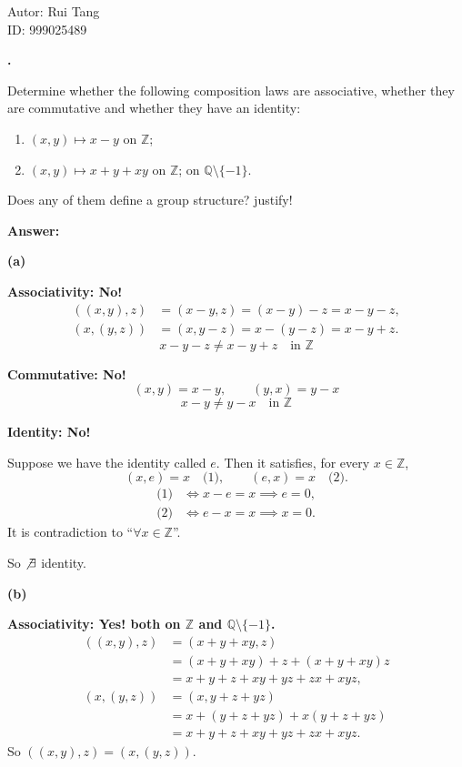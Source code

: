 \documentclass[11pt]{article}
\newcounter{ej}
\renewcommand{\theej}{\textbf{\arabic{ej}.}}
\newenvironment{ej}{
    \stepcounter{ej}
    \begin{list}{\theej}{
        \setlength{\itemindent}{0ex}
        \setlength{\labelwidth}{4ex}
        \setlength{\labelsep}{0.5ex}
        \setlength{\leftmargin}{4ex}
        \setlength{\listparindent}{0ex}
        \setlength{\topsep}{3mm plus 0.5mm minus 0.5mm}
        \setlength{\parsep}{0mm}
        \setlength{\itemsep}{1mm plus 0.3mm minus 0.3mm}
        \setlength{\rightmargin}{0ex}
    }
    \item
}{\end{list}}
\newenvironment{sol}{
    \def\FrameCommand##1{\fcolorbox{black}{gray!20}{##1}}%
    \MakeFramed{\advance\hsize-\width \FrameRestore}%
    \noindent\textbf{Answer:} \ignorespaces
}{\endMakeFramed}
\newcommand{\Z}{\mathbb{Z}}
\newcommand{\Q}{\mathbb{Q}}
\begin{document}
    \thispagestyle{fancy}

    \begin{center}
        \large Autor: Rui Tang \\
        ID: 999025489
    \end{center}

    \begin{ej}
        Determine whether the following composition laws are associative,
        whether they are commutative and whether they have an identity:
        \begin{enumerate}
            \item $(x,y)\mapsto x-y$ on $\Z$;
            \item $(x,y)\mapsto x+y+xy$ on $\Z$; on $\Q\setminus\{-1\}$.
        \end{enumerate}
        Does any of them define a group structure? justify!

        \begin{sol}
            \textbf{(a)}

            \textbf{Associativity: No!}
            \begin{align*}
                ((x,y),z) &= (x-y,z)=(x-y)-z=x-y-z,\\
                (x,(y,z)) &= (x,y-z)=x-(y-z)=x-y+z.
            \end{align*}
            \[
                x-y-z\ne x-y+z\quad\text{in }\Z
            \]

            \textbf{Commutative: No!}
            \[
                (x,y)=x-y,\qquad (y,x)=y-x
            \]
            \[
                x-y\ne y-x\quad\text{in }\Z
            \]

            \textbf{Identity: No!}

            Suppose we have the identity called $e$. Then it satisfies, for
            every $x\in\Z$,
            \[
                (x,e)=x\quad\text{(1)},\qquad
                (e,x)=x\quad\text{(2)}.
            \]
            \begin{align*}
                \text{(1)}&\iff x-e=x\implies e=0,\\
                \text{(2)}&\iff e-x=x\implies x=0.
            \end{align*}
            It is contradiction to ``$\forall x\in\Z$''.

            So $\not\exists$ identity.

            \medskip
            \textbf{(b)}

            \textbf{Associativity: Yes! both on $\Z$ and $\Q\setminus\{-1\}$.}
            \begin{align*}
                ((x,y),z)
                    &= (x+y+xy,z)\\
                    &= (x+y+xy)+z+(x+y+xy)z\\
                    &= x+y+z+xy+yz+zx+xyz,\\[4pt]
                (x,(y,z))
                    &= (x,y+z+yz)\\
                    &= x+(y+z+yz)+x(y+z+yz)\\
                    &= x+y+z+xy+yz+zx+xyz.
            \end{align*}
            So $((x,y),z)=(x,(y,z))$.


\end{sol}
\end{ej}
\end{document}

